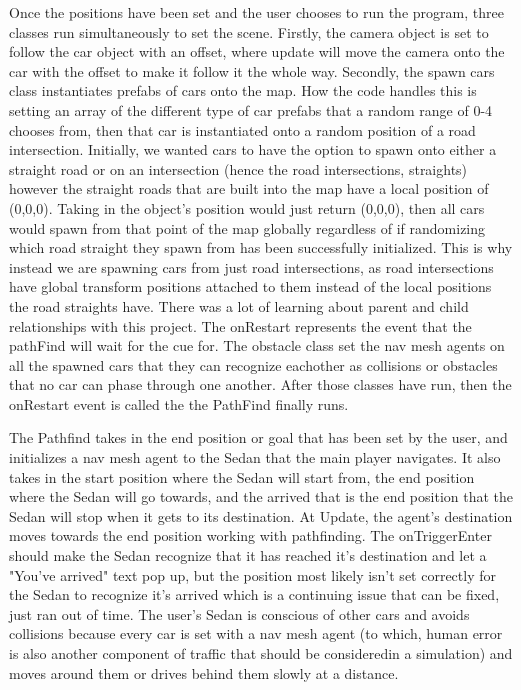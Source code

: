 \begin{flushleft}
Once the positions have been set and the user chooses to run the program, three classes run simultaneously to set the scene. Firstly, the camera object is set to follow the car object with an offset, where update will move the camera onto the car with the offset to make it follow it the whole way. Secondly, the spawn cars class instantiates prefabs of cars onto the map. How the code handles this is setting an array of the different type of car prefabs that a random range of 0-4 chooses from, then that car is instantiated onto a random position of a road intersection. Initially, we wanted cars to have the option to spawn onto either a straight road or on an intersection (hence the road intersections, straights) however the straight roads that are built into the map have a local position of (0,0,0). Taking in the object's position would just return (0,0,0), then all cars would spawn from that point of the map globally regardless of if randomizing which road straight they spawn from has been successfully initialized. This is why instead we are spawning cars from just road intersections, as road intersections have global transform positions attached to them instead of the local positions the road straights have. There was a lot of learning about parent and child relationships with this project. The onRestart represents the event that the pathFind will wait for the cue for. The obstacle class set the nav mesh agents on all the spawned cars that they can recognize eachother as collisions or obstacles that no car can phase through one another. After those classes have run, then the onRestart event is called the the PathFind finally runs.
 \end{flushleft}

\begin{flushleft}
The Pathfind takes in the end position or goal that has been set by the user, and initializes a nav mesh agent to the Sedan that the main player navigates. It also takes in the start position where the Sedan will start from, the end position where the Sedan will go towards, and the arrived that is the end position that the Sedan will stop when it gets to its destination. At Update, the agent's destination moves towards the end position working with pathfinding. The onTriggerEnter should make the Sedan recognize that it has reached it's destination and let a "You've arrived" text pop up, but the position most likely isn't set correctly for the Sedan to recognize it's arrived which is a continuing issue that can be fixed, just ran out of time. The user's Sedan is conscious of other cars and avoids collisions because every car is set with a nav mesh agent (to which, human error is also another component of traffic that should be consideredin a simulation) and moves around them or drives behind them slowly at a distance.
 \end{flushleft}


